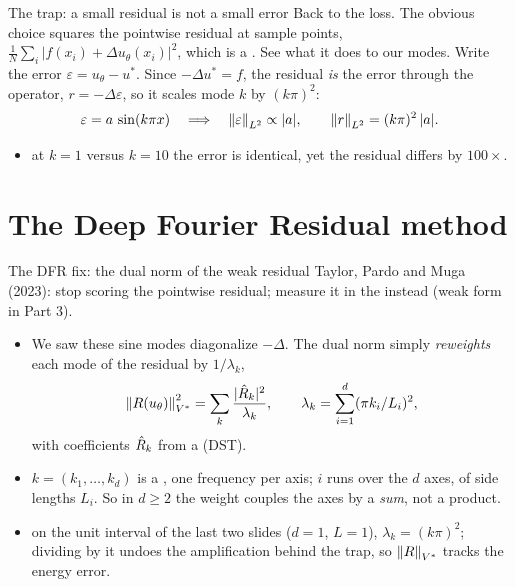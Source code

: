 \documentclass[11pt,aspectratio=169]{beamer}
\begin{document}
\begin{frame}{The trap: a small residual is not a small error}
  Back to the loss. The obvious choice squares the pointwise residual at sample
  points, $\frac{1}{N}\sum_i |f(x_i) + \Delta u_\theta(x_i)|^2$, which is a
  . See what it does to our modes.
  \medskip
  Write the error $\varepsilon = u_\theta - u^*$. Since $-\Delta u^* = f$, the
  residual \emph{is} the error through the operator, $r = -\Delta\varepsilon$, so
  it scales mode $k$ by $(k\pi)^2$:
  \[
    \varepsilon = a\,\sin(k\pi x)
    \quad\Longrightarrow\quad
    \left\|\varepsilon\right\|_{L^2} \propto |a|,
    \qquad
    \left\|r\right\|_{L^2} = (k\pi)^2\,|a| .
  \]
  \begin{itemize}\itemsep0.3em
    \item {} at $k = 1$ versus
          $k = 10$ the error is identical, yet the residual differs by $100\times$.
  \end{itemize}
\end{frame}

\section{The Deep Fourier Residual method}

\begin{frame}{The DFR fix: the dual norm of the weak residual}
  Taylor, Pardo and Muga (2023): stop scoring the pointwise residual; measure it
  in the  instead (weak form in Part 3).
  \begin{itemize}\itemsep0.5em
    \item We saw these sine modes diagonalize $-\Delta$. The dual norm simply
          \emph{reweights} each mode of the residual by $1/\lambda_k$,
          \[
            \left\|R(u_\theta)\right\|_{V^*}^2 = \sum_k \frac{|\hat{R}_k|^2}{\lambda_k},
            \qquad \lambda_k = \sum_{i=1}^{d} (\pi k_i / L_i)^2 ,
          \]
          with coefficients $\hat{R}_k$ from a  (DST).
    \item $k = (k_1, \dots, k_d)$ is a , one frequency per
          axis; $i$ runs over the $d$ axes, of side lengths $L_i$. So in
          $d \ge 2$ the weight couples the axes by a \emph{sum}, not a product.
    \item {} on the unit interval of the last two slides
          ($d = 1$, $L = 1$), $\lambda_k = (k\pi)^2$; dividing by it undoes the
          amplification behind the trap, so $\left\|R\right\|_{V^*}$ tracks the
          energy error.
  \end{itemize}
\end{frame}
\end{document}
